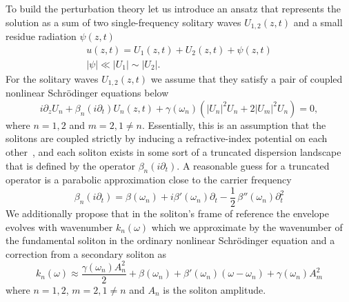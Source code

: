 \documentclass[aps, prl, twocolumn, superscriptaddress, final]{revtex4}
\newcommand{\abs}[1]{\left| #1 \right|}
\begin{document}
\begin{widetext}

\noindent To build the perturbation theory let us introduce an ansatz that represents the solution as a sum of two single-frequency solitary waves $U_{1, 2}(z, t)$ and a small residue radiation $\psi(z, t)$
\begin{gather}
  \label{eq:PerturbationAnsatz}
  u(z, t) = U_{1}(z, t) + U_{2}(z, t) + \psi(z, t) \\
  \abs{\psi} \ll \abs{U_{1}} \sim \abs{U_{2}}. \nonumber
\end{gather}
For the solitary waves $U_{1, 2}(z, t)$ we assume that they satisfy a pair of coupled nonlinear Schr\"odinger equations below
\begin{equation}
  \label{eq:CoupledSolitons}
  i \partial_{z} U_{n}
    + \beta_{n}(i \partial_{t}) U_{n}(z, t)
    + \gamma(\omega_{n}) \left(
      \abs{U_{n}}^{2} U_{n} + 2 \abs{U_{m}}^{2} U_{n}
    \right) = 0,
\end{equation}
where $n = 1, 2$ and $m = 2, 1 \ne n$. Essentially, this is an assumption that the solitons are coupled strictly by inducing a refractive-index potential on each other~\cite{agrawal2013nonlinear}, and each soliton exists in some sort of a truncated dispersion landscape that is defined by the operator $\beta_{n}(i \partial_{t})$. A reasonable guess for a truncated operator is a parabolic approximation close to the carrier frequency
\begin{equation}
  \label{eq:TruncatedDispersionOperator}
  \beta_{n}(i \partial_{t}) =
    \beta(\omega_{n}) +
    i \beta'(\omega_{n}) \partial_{t} -
    \frac{1}{2} \, \beta''(\omega_{n}) \partial_{t}^{2}
\end{equation}
We additionally propose that in the soliton's frame of reference the envelope evolves with wavenumber $k_{n}(\omega)$ which we approximate by the wavenumber of the fundamental soliton in the ordinary nonlinear Schr\"odinger equation and a correction from a secondary soliton as
\begin{equation}
  \label{eq:SolitonWavenumber}
  k_{n}(\omega)
    \approx \frac{\gamma(\omega_{n}) A_{n}^{2}}{2}
    + \beta(\omega_{n}) + \beta'(\omega_{n}) (\omega - \omega_{n})
    + \gamma(\omega_{n}) A_{m}^{2}
\end{equation}
where $n = 1, 2$, $m = 2, 1 \ne n$ and $A_{n}$ is the soliton amplitude.


\end{widetext}
\end{document}
